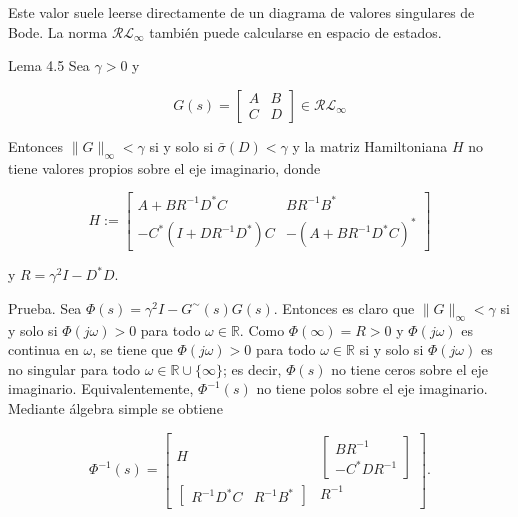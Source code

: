 Este valor suele leerse directamente de un diagrama de valores singulares de Bode. La norma $\mathcal{R} \mathcal{L}_{\infty}$ también puede calcularse en espacio de estados.

Lema 4.5 Sea $\gamma>0$ y

\[
G(s)=\left[\begin{array}{c|c}
A & B  \tag{4.2}\\
\hline C & D
\end{array}\right] \in \mathcal{R} \mathcal{L}_{\infty}
\]

Entonces $\|G\|_{\infty}<\gamma$ si y solo si $\bar{\sigma}(D)<\gamma$ y la matriz Hamiltoniana $H$ no tiene valores propios sobre el eje imaginario, donde

\[
H:=\left[\begin{array}{cc}
A+B R^{-1} D^{*} C & B R^{-1} B^{*}  \tag{4.3}\\
-C^{*}\left(I+D R^{-1} D^{*}\right) C & -\left(A+B R^{-1} D^{*} C\right)^{*}
\end{array}\right]
\]

y $R=\gamma^{2} I-D^{*} D$.

Prueba. Sea $\Phi(s)=\gamma^{2} I-G^{\sim}(s) G(s)$. Entonces es claro que $\|G\|_{\infty}<\gamma$ si y solo si $\Phi(j \omega)>0$ para todo $\omega \in \mathbb{R}$. Como $\Phi(\infty)=R>0$ y $\Phi(j \omega)$ es continua en $\omega$, se tiene que $\Phi(j \omega)>0$ para todo $\omega \in \mathbb{R}$ si y solo si $\Phi(j \omega)$ es no singular para todo $\omega \in \mathbb{R} \cup\{\infty\}$; es decir, $\Phi(s)$ no tiene ceros sobre el eje imaginario. Equivalentemente, $\Phi^{-1}(s)$ no tiene polos sobre el eje imaginario. Mediante álgebra simple se obtiene


$$
\Phi^{-1}(s)=\left[\begin{array}{c|c}
H & {\left[\begin{array}{c}
B R^{-1} \\
-C^* D R^{-1}
\end{array}\right]} \\
\hline\left[\begin{array}{ll}
R^{-1} D^* C & R^{-1} B^*
\end{array}\right] & R^{-1}
\end{array}\right] .
$$

